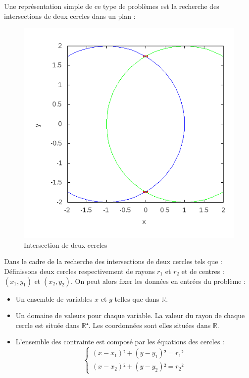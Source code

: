 Une représentation simple de ce type de problèmes est la recherche des intersections de deux cercles dans un plan : 
\begin{figure}[h] %
  \center
\includegraphics[scale=0.43]{img/circle-circle}
  \caption{Intersection de deux cercles} %
 \label{fig:Deuxcerlces} %
\end{figure} %
\clearpage
Dans le cadre de la recherche des intersections de deux cercles tels que : 
Définissons deux cercles respectivement de rayons  $r_1$ et $r_2$ et de centres : $(x_1,y_1)$ et $(x_2,y_2)$.
On peut alors fixer les données en entrées du problème :

\begin{itemize}
\item
Un ensemble de variables $x$ et $y$ telles que  dans $\mathbb{R}$.

\item
Un domaine de valeurs pour chaque variable. La valeur du rayon de chaque cercle est située dans  $\mathbb{R⁺}$. Les coordonnées sont elles situées dans  $\mathbb{R}$.
\item
L'ensemble des contrainte est composé par les équations des cercles :
\begin{equation}\label{eq}
\begin{cases}
(x-x_1)²+(y-y_1)² = r_1²\\
(x-x_2)²+(y-y_2)² = r_2²
\end{cases}
\end{equation}




\end{itemize}


